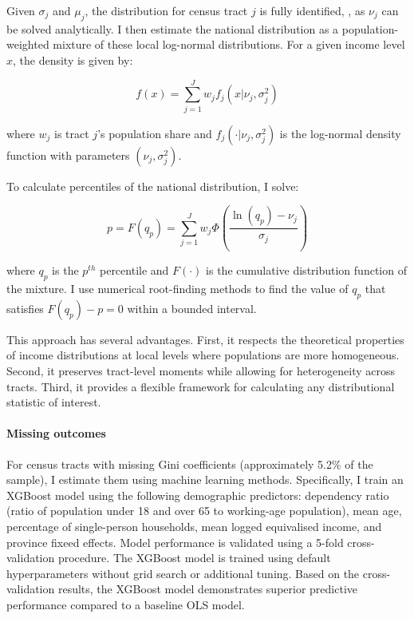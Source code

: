 Given $\sigma_j$ and $\mu_j$, the distribution for census tract $j$ is fully identified, , as $\nu_j$ can be solved analytically. I then estimate the national distribution as a population-weighted mixture of these local log-normal distributions. For a given income level $x$, the density is given by:

\begin{equation}
f(x) = \sum_{j=1}^{J} w_j f_j(x|\nu_j,\sigma_j^2)
\end{equation}

where $w_j$ is tract $j$'s population share and $f_j(\cdot|\nu_j,\sigma_j^2)$ is the log-normal density function with parameters $(\nu_j,\sigma_j^2)$.

To calculate percentiles of the national distribution, I solve:

\begin{equation}
p = F(q_p) = \sum_{j=1}^{J} w_j \Phi\left(\frac{\ln(q_p) - \nu_j}{\sigma_j}\right)
\end{equation}

where $q_p$ is the $p^{th}$ percentile and $F(\cdot)$ is the cumulative distribution function of the mixture. I use numerical root-finding methods to find the value of $q_p$ that satisfies $F(q_p) - p = 0$ within a bounded interval.

This approach has several advantages. First, it respects the theoretical properties of income distributions at local levels where populations are more homogeneous. Second, it preserves tract-level moments while allowing for heterogeneity across tracts. Third, it provides a flexible framework for calculating any distributional statistic of interest.

\paragraph{Missing outcomes} For census tracts with missing Gini coefficients (approximately 5.2\% of the sample), I estimate them using machine learning methods. Specifically, I train an XGBoost model using the following demographic predictors: dependency ratio (ratio of population under 18 and over 65 to working-age population), mean age, percentage of single-person households, mean logged equivalised income, and province fixeed effects. Model performance is validated using a 5-fold cross-validation procedure. The XGBoost model is trained using default hyperparameters without grid search or additional tuning. Based on the cross-validation results, the XGBoost model demonstrates superior predictive performance compared to a baseline OLS model.

